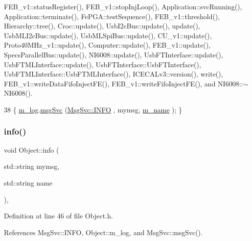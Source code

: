 F\+E\+B\+\_\+v1\+::status\+Register(), F\+E\+B\+\_\+v1\+::stop\+Inj\+Loop(), Application\+::svc\+Running(), Application\+::terminate(), Fe\+P\+G\+A\+::test\+Sequence(), F\+E\+B\+\_\+v1\+::threshold(), Hierarchy\+::tree(), Croc\+::update(), Usb\+I2c\+Bus\+::update(), update(), Usb\+M\+L\+I2c\+Bus\+::update(), Usb\+M\+L\+Spi\+Bus\+::update(), C\+U\+\_\+v1\+::update(), Proto40\+M\+Hz\+\_\+v1\+::update(), Computer\+::update(), F\+E\+B\+\_\+v1\+::update(), Specs\+Parallel\+Bus\+::update(), N\+I6008\+::update(), Usb\+F\+T\+Interface\+::update(), Usb\+F\+T\+M\+L\+Interface\+::update(), Usb\+F\+T\+Interface\+::\+Usb\+F\+T\+Interface(), Usb\+F\+T\+M\+L\+Interface\+::\+Usb\+F\+T\+M\+L\+Interface(), I\+C\+E\+C\+A\+Lv3\+::version(), write(), F\+E\+B\+\_\+v1\+::write\+Data\+Fifo\+Inject\+F\+E(), F\+E\+B\+\_\+v1\+::write\+Fifo\+Inject\+F\+E(), and N\+I6008\+::$\sim$\+N\+I6008().


\begin{DoxyCode}
38 \{ \hyperlink{classObject_a0d269813dd7ac1f24bc143031e2963f2}{m\_log}.\hyperlink{classMsgSvc_ad25f18047920cc59a314e5098259711c}{msgSvc} (\hyperlink{classMsgSvc_ae671eb7301996cd049d2da8a65925926ad2fcf3f3e734fc41ee097cc23670ce51}{MsgSvc::INFO}    , mymsg, \hyperlink{classObject_a8b83c95c705d2c3ba0d081fe1710f48d}{m\_name} ); \}
\end{DoxyCode}
\mbox{\label{classObject_a1ca123253dfd30fc28b156f521dcbdae}} 
\subsubsection{\texorpdfstring{info()}{info()}\hspace{0.1cm}{\footnotesize\ttfamily [2/2]}}
{\footnotesize\ttfamily void Object\+::info (\begin{DoxyParamCaption}\item[{std\+::string}]{mymsg,  }\item[{std\+::string}]{name }\end{DoxyParamCaption})\hspace{0.3cm}{\ttfamily [inline]}, {\ttfamily [inherited]}}



Definition at line 46 of file Object.\+h.



References Msg\+Svc\+::\+I\+N\+FO, Object\+::m\+\_\+log, and Msg\+Svc\+::msg\+Svc().


